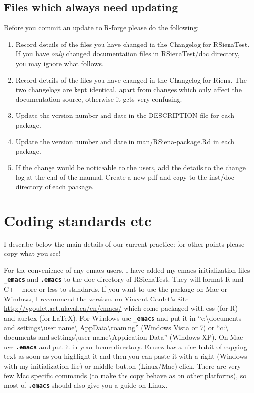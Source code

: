 \documentclass[12pt, a4paper]{article}
\renewcommand{\=}{\,=\,}
\newcommand{\+}{\,+\,}
\newcommand{\sfn}[1]{\textbf{\texttt{#1}}}
\begin{document}
\subsection{Files which always need updating}
 Before you commit an update to R-forge please do the following:
\begin{enumerate}
\item Record details of the files you have changed in the Changelog for
  RSienaTest. If you have \emph{only} changed documentation files in
  \textsf{RSienaTest/doc} directory, you may ignore what follows.
\item Record details of the files you have changed in the Changelog for Riena.
  The two changelogs are kept identical, apart from changes which only affect
  the documentation source, otherwise it gets very confusing.
\item Update the version number and date in the \textsf{DESCRIPTION} file for
  each package.
\item Update the version number and date in \textsf{man/RSiena-package.Rd} in
  each package.
\item If the change would be noticeable to the users, add the details to the
  change log at the end of the manual. Create a new pdf and copy to the inst/doc
  directory of each package.
\end{enumerate}
\section{Coding standards etc}

I describe below the main details of our current practice: for other points
please copy what you see!

For the convenience of any emacs users, I have added my emacs initialization
files \sfn{\_emacs} and \sfn{.emacs} to the doc directory of RSienaTest. They
will format R and C++ more or less to standards. If you want to use the package
on Mac or Windows, I recommend the versions on Vincent Goulet's Site
\url{http://vgoulet.act.ulaval.ca/en/emacs/} which come packaged with ess (for
R) and auctex (for \LaTeX). For Windows use \sfn{\_emacs} and put it in
``c:\textbackslash documents and settings\textbackslash user name\textbackslash
AppData\textbackslash roaming'' (Windows Vista or 7) or ``c:\textbackslash
documents and settings\textbackslash user name\textbackslash Application Data''
(Windows XP). On Mac use \sfn{.emacs} and put it in your home directory. Emacs
has a nice habit of copying text as soon as you highlight it and then you can
paste it with a right (Windows with my initialization file) or middle button
(Linux/Mac) click. There are very few Mac specific commands (to make the copy
behave as on other platforms), so most of \sfn{.emacs} should also give you a
guide on Linux.
\end{document}
